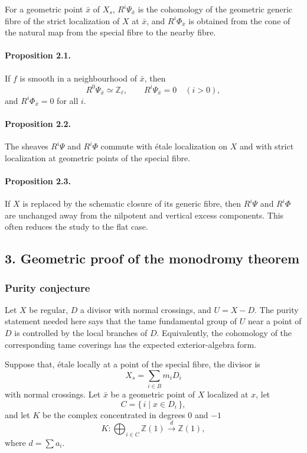 \documentclass[11pt]{article}
\theoremstyle{plain}
\theoremstyle{definition}
\theoremstyle{remark}
\newcommand{\ZZ}{\mathbb Z}
\begin{document}
For a geometric point $\bar x$ of $X_s$, $R^i\Psi_{\bar x}$ is the cohomology of the geometric generic fibre of the strict localization of $X$ at $\bar x$, and $R^i\Phi_{\bar x}$ is obtained from the cone of the natural map from the special fibre to the nearby fibre.

\paragraph{Proposition 2.1.}
If $f$ is smooth in a neighbourhood of $\bar x$, then
\[
R^0\Psi_{\bar x}\simeq\ZZ_\ell,\qquad R^i\Psi_{\bar x}=0\quad(i>0),
\]
and $R^i\Phi_{\bar x}=0$ for all $i$.

\paragraph{Proposition 2.2.}
The sheaves $R^i\Psi$ and $R^i\Phi$ commute with étale localization on $X$ and with strict localization at geometric points of the special fibre.

\paragraph{Proposition 2.3.}
If $X$ is replaced by the schematic closure of its generic fibre, then $R^i\Psi$ and $R^i\Phi$ are unchanged away from the nilpotent and vertical excess components. This often reduces the study to the flat case.

\subsection*{3. Geometric proof of the monodromy theorem}

\subsubsection*{Purity conjecture}

Let $X$ be regular, $D$ a divisor with normal crossings, and $U=X-D$. The purity statement needed here says that the tame fundamental group of $U$ near a point of $D$ is controlled by the local branches of $D$. Equivalently, the cohomology of the corresponding tame coverings has the expected exterior-algebra form.

Suppose that, étale locally at a point of the special fibre, the divisor is
\[
X_s=\sum_{i\in B}m_iD_i
\]
with normal crossings. Let $\bar x$ be a geometric point of $X$ localized at $x$, let
\[
C=\{\,i\mid x\in D_i\,\},
\]
and let $K$ be the complex concentrated in degrees $0$ and $-1$
\[
K:\bigoplus_{i\in C}\ZZ(1)\xrightarrow{\ d\ }\ZZ(1),
\]
where $d=\sum a_i$.
\end{document}
